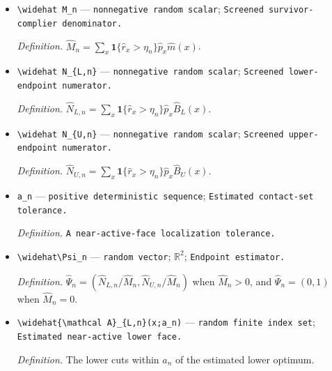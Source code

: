 \documentclass{article}
\begin{document}
\begin{itemize}
  \par\smallskip\noindent\emph{Definition.} A zero-cell omission threshold satisfying \(\eta_n\to0\) and \(\sqrt n\eta_n\to\infty\).
  \item \texttt{\textbackslash{}\allowbreak{}widehat M\_\allowbreak{}n} --- \texttt{nonnegative random scalar}; \texttt{Screened survivor-\allowbreak{}complier denominator.}
  \par\smallskip\noindent\emph{Definition.} \(\widehat M_n=\sum_x\mathbf 1\{\widehat r_x>\eta_n\}\widehat p_x\widehat m(x)\).
  \item \texttt{\textbackslash{}\allowbreak{}widehat N\_\allowbreak{}\{L,\allowbreak{}n\}\allowbreak{}} --- \texttt{nonnegative random scalar}; \texttt{Screened lower-\allowbreak{}endpoint numerator.}
  \par\smallskip\noindent\emph{Definition.} \(\widehat N_{L,n}=\sum_x\mathbf 1\{\widehat r_x>\eta_n\}\widehat p_x\widehat B_L(x)\).
  \item \texttt{\textbackslash{}\allowbreak{}widehat N\_\allowbreak{}\{U,\allowbreak{}n\}\allowbreak{}} --- \texttt{nonnegative random scalar}; \texttt{Screened upper-\allowbreak{}endpoint numerator.}
  \par\smallskip\noindent\emph{Definition.} \(\widehat N_{U,n}=\sum_x\mathbf 1\{\widehat r_x>\eta_n\}\widehat p_x\widehat B_U(x)\).
  \item \texttt{a\_\allowbreak{}n} --- \texttt{positive deterministic sequence}; \texttt{Estimated contact-\allowbreak{}set tolerance.}
  \par\smallskip\noindent\emph{Definition.} \texttt{A near-\allowbreak{}active-\allowbreak{}face localization tolerance.}
  \item \texttt{\textbackslash{}\allowbreak{}widehat\textbackslash{}\allowbreak{}Psi\_\allowbreak{}n} --- \texttt{random vector}; \(\mathbb R^2\); \texttt{Endpoint estimator.}
  \par\smallskip\noindent\emph{Definition.} \(\widehat\Psi_n=(\widehat N_{L,n}/\widehat M_n,\widehat N_{U,n}/\widehat M_n)\) when \(\widehat M_n>0\), and \(\widehat\Psi_n=(0,1)\) when \(\widehat M_n=0\).
  \item \texttt{\textbackslash{}\allowbreak{}widehat\{\textbackslash{}\allowbreak{}mathcal A\}\allowbreak{}\_\allowbreak{}\{L,\allowbreak{}n\}\allowbreak{}(x;\allowbreak{}a\_\allowbreak{}n)} --- \texttt{random finite index set}; \texttt{Estimated near-\allowbreak{}active lower face.}
  \par\smallskip\noindent\emph{Definition.} The lower cuts within \(a_n\) of the estimated lower optimum.

\end{itemize}
\end{document}
